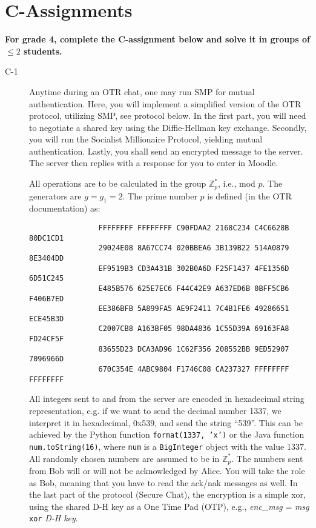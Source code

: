 \documentclass{article}
\begin{document}
		\clearpage
		
		\section*{C-Assignments}
		\textbf{For grade 4, complete the C-assignment below and solve it in groups of $\leq 2$ students.}
		
		\begin{description}
			\item[C-1]{Anytime during an OTR chat, one may run SMP for mutual authentication. Here, you will implement
				a simplified version of the OTR protocol, utilizing SMP, see protocol below. In the first part,
				you will need to negotiate a shared key using the Diffie-Hellman key exchange.
				Secondly, you will run the Socialist Millionaire Protocol, yielding mutual authentication.
				Lastly, you shall send an encrypted message to the server. The server then replies with a response for you to enter in Moodle.
				
				All operations are to be calculated in the group $\mathbb{Z}_p^*$, i.e., mod $p$. The generators are $g = g_1 = 2$.
				The prime number $p$ is defined (in the OTR documentation) as:
				\begin{verbatim}
				FFFFFFFF FFFFFFFF C90FDAA2 2168C234 C4C6628B 80DC1CD1
				29024E08 8A67CC74 020BBEA6 3B139B22 514A0879 8E3404DD
				EF9519B3 CD3A431B 302B0A6D F25F1437 4FE1356D 6D51C245
				E485B576 625E7EC6 F44C42E9 A637ED6B 0BFF5CB6 F406B7ED
				EE386BFB 5A899FA5 AE9F2411 7C4B1FE6 49286651 ECE45B3D
				C2007CB8 A163BF05 98DA4836 1C55D39A 69163FA8 FD24CF5F
				83655D23 DCA3AD96 1C62F356 208552BB 9ED52907 7096966D
				670C354E 4ABC9804 F1746C08 CA237327 FFFFFFFF FFFFFFFF
				\end{verbatim}
				
				All integers sent to and from the server are encoded in hexadecimal string representation, e.g. if we
				want to send the decimal number 1337, we interpret it in hexadecimal, 0x539, and send the string ``539''. This can
				be achieved by the Python function \texttt{format(1337, 'x')} or the Java function \texttt{num.toString(16)}, where
				\texttt{num} is a \texttt{BigInteger} object with the value $1337$. All randomly chosen numbers are assumed to be in
				$\mathbb{Z}_p^*$. The numbers sent from Bob will or will not be acknowledged by Alice. You will take the role as Bob, meaning
				that you have to read the ack/nak messages as well. In the last part of the protocol (Secure Chat), the encryption
				is a simple xor, using the shared D-H key as a One Time Pad (OTP), e.g., 
				\emph{enc\_msg} = \emph{msg} \texttt{xor} \emph{D-H key}.
				
}
\end{description}
\end{document}
